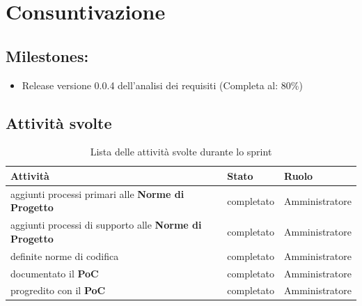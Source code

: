 \section{Consuntivazione}

\subsection{Milestones:}
\begin{itemize}
    \item Release versione 0.0.4 dell'analisi dei requisiti (Completa al: 80\%)
\end{itemize}

\subsection{Attività svolte}

\begin{table}[ht]
    \begin{tabularx}{\textwidth}{X l l}
        
        \rowcolor{gray!30} \textbf{Attività} & \textbf{Stato} & \textbf{Ruolo}\\
        
        \hline
        aggiunti processi primari alle \textbf{Norme di Progetto} & completato & Amministratore\\
        aggiunti processi di supporto alle \textbf{Norme di Progetto} & completato & Amministratore\\
        definite norme di codifica & completato & Amministratore\\
        documentato il \textbf{PoC} & completato & Amministratore\\
        progredito con il \textbf{PoC}& completato & Amministratore\\
        \end{tabularx}
    \caption{Lista delle attività svolte durante lo sprint}
\end{table}


